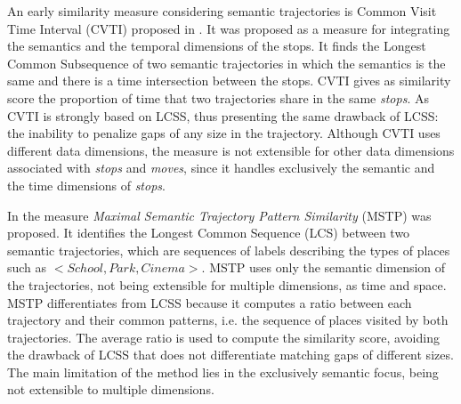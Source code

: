 An early similarity measure considering semantic trajectories is Common Visit Time Interval (CVTI) proposed in \cite{Kang:2009:SMT:1529282.1529580}. It was proposed as a measure for integrating the semantics {and the temporal dimensions of the stops}. It finds the Longest Common Subsequence of two semantic trajectories in which the semantics is the same and there is a time intersection between the stops. CVTI gives as similarity score the proportion of time that two trajectories share in the same \emph{stops}.
As CVTI is strongly based on LCSS, thus presenting the same drawback of LCSS: the inability to penalize gaps of any size in the trajectory. Although CVTI uses different data dimensions, the measure is not extensible for other data dimensions associated with \emph{stops} and \emph{moves}, since it handles exclusively the semantic and the time dimensions of \emph{stops}.



In \cite{Ying:2010:MUS:1867699.1867703} the measure \emph{Maximal Semantic Trajectory Pattern Similarity} (MSTP) was proposed. It identifies the Longest Common Sequence (LCS) between two semantic trajectories, which are sequences of labels describing the types of places such as $<School, Park, Cinema>$. {MSTP uses only the semantic dimension of the trajectories, not being extensible for multiple dimensions, as time and space.} MSTP differentiates from LCSS because it computes a ratio between each trajectory and their common patterns, i.e. the sequence of places visited by both trajectories. The average ratio is used to compute the similarity score, avoiding the drawback of LCSS that does not differentiate matching gaps of different sizes. {The main limitation of the method lies in the exclusively semantic focus, being not extensible to multiple dimensions.}


